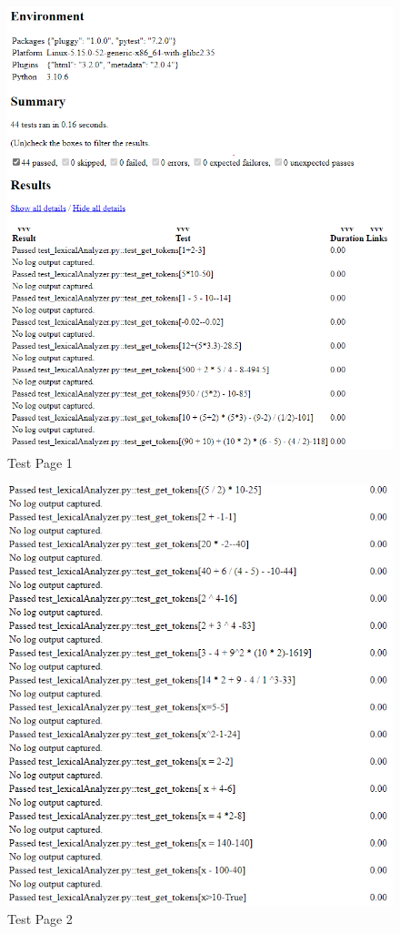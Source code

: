 \documentclass[a4paper, oneside, 11pt]{report}
\begin{document}
\begin{figure}[H]
    \centering
    \includegraphics[width=15cm]{pytest 1.png}
    \caption{Test Page 1}
    \label{fig:pytest1}
\end{figure}

\begin{figure}[H]
    \centering
    \includegraphics[width=15cm]{pytest 2.png}
    \caption{Test Page 2}
    \label{fig:pytest2}
\end{figure}
\end{document}
